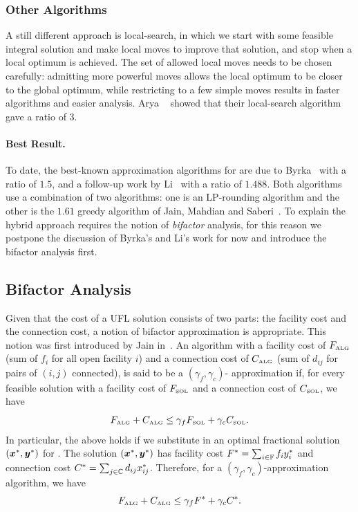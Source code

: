 \documentclass[oneside,final]{ucr}
\begin{document}
\subsubsection{Other Algorithms}
A still different approach is local-search, in which we
start with some feasible integral solution and make local
moves to improve that solution, and stop when a local
optimum is achieved. The set of allowed local moves needs to
be chosen carefully: admitting more powerful moves allows
the local optimum to be closer to the global optimum, while
restricting to a few simple moves results in faster
algorithms and easier analysis. Arya
{\etal}~\cite{AryaGKMMP01} showed that their local-search
algorithm gave a ratio of $3$.

\paragraph{Best Result.} To date, the best-known
approximation algorithms for {\UFL} are due to
Byrka~\cite{Byrka07} with a ratio of $1.5$, and a follow-up
work by Li~\cite{Li11} with a ratio of $1.488$. Both
algorithms use a combination of two algorithms: one is an
LP-rounding algorithm and the other is the $1.61$ greedy
algorithm of Jain, Mahdian and Saberi~\cite{JainMS02}. To
explain the hybrid approach requires the notion of
\emph{bifactor} analysis, for this reason we postpone the
discussion of Byrka's and Li's work for now and introduce
the bifactor analysis first.

\subsection{Bifactor Analysis} \label{subsec: bifactor}
Given that the cost of a UFL solution consists of two parts:
the facility cost and the connection cost, a notion of
bifactor approximation is appropriate. This notion was first
introduced by Jain {\etal} in~\cite{JainMMSV03}. An
algorithm with a facility cost of $F_{\mbox{\tiny\rm ALG}}$ (sum of
$f_i$ for all open facility $i$) and a connection cost of
$C_{\mbox{\tiny\rm ALG}}$ (sum of $d_{ij}$ for pairs of $(i,j)$
connected), is said to be a $(\gamma_f,\gamma_c)$-
approximation if, for every feasible solution {\SOL} with a
facility cost of $F_{{{\mbox{\tiny\rm SOL}}}}$ and a connection cost of
$C_{{{\mbox{\tiny\rm SOL}}}}$, we have
\begin{equation*}
  F_{\mbox{\tiny\rm ALG}} + C_{\mbox{\tiny\rm ALG}} \leq \gamma_f F_{{{\mbox{\tiny\rm SOL}}}} +
  \gamma_c C_{{{\mbox{\tiny\rm SOL}}}}.
\end{equation*}
In particular, the above holds if we substitute in an
optimal fractional solution $(\boldsymbol{x}^\ast,\boldsymbol{y}^\ast)$ for
{\SOL}. The solution $(\boldsymbol{x}^\ast,\boldsymbol{y}^\ast)$ has facility
cost $F^\ast = \sum_{i\in\mathbb{F}} f_i y_i^\ast$ and
connection cost $C^\ast = \sum_{j\in\mathbb{C}} d_{ij}
x_{ij}^\ast$. Therefore, for a
$(\gamma_f,\gamma_c)$-approximation algorithm, we have
\begin{equation*}
  F_{\mbox{\tiny\rm ALG}} + C_{\mbox{\tiny\rm ALG}} \leq \gamma_f F^\ast +
  \gamma_c C^\ast.
\end{equation*}
\end{document}
